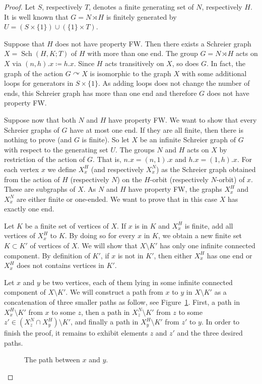 \documentclass[a4paper]{article}
\theoremstyle{definition}
\theoremstyle{remark}%
\DeclareMathOperator\Sch{Sch}
\begin{document}
%
\begin{proof}
Let $S$, respectively $T$, denotes a finite generating set of $N$, respectively $H$.
It is well known that $G=N\rtimes H$ is finitely generated by $U=(S\times\{1\}) \cup(\{1\}\times T)$.

Suppose that $H$ does not have property FW. Then there exists a Schreier graph $X=\Sch(H,K;T)$ of $H$ with more than one end. The group $G=N\rtimes H$ acts on $X$ via $(n,h).x \coloneqq h.x$.
Since $H$ acts transitively on $X$, so does $G$.
In fact, the graph of the action $G \curvearrowright X$ is isomorphic to the graph $X$ with some additional loops for generators in $S\times\{1\}$. As adding loops does not change the number of ends, this Schreier graph has more than one end and therefore $G$ does not have property FW.

Suppose now that both $N$ and $H$ have property FW. We want to show that every Schreier graphs of $G$ have at most one end. If they are all finite, then there is nothing to prove (and $G$ is finite). So let $X$ be an infinite Schreier graph of $G$ with respect to the generating set $U$. The groups $N$ and $H$ acts on $X$ by restriction of the action of $G$. That is, $n.x = (n,1).x$ and $h.x = (1,h).x$.
For each vertex $x$ we define $X_x^H$ (and respectively $X_x^N$) as the Schreier graph obtained from the action of $H$ (respectively $N$) on the $H$-orbit (respectively $N$-orbit) of $x$. These are subgraphs of $X$. As $N$ and $H$ have property FW, the graphs $X_x^H$ and $X_x^N$ are either finite or one-ended. We want to prove that in this case $X$ has exactly one end. 

Let $K$ be a finite set of vertices of $X$.
If $x$ is in $K$ and $X_x^H$ is finite, add all vertices of $X_x^H$ to $K$.
By doing so for every $x$ in $K$, we obtain a new finite set $K\subset K'$ of vertices of $X$.
We will show that $X\setminus K'$ has only one infinite connected component.
By definition of $K'$, if $x$ is not in $K'$, then either $X_x^H$ has one end or $X_x^H$ does not contains vertices in $K'$. 

Let $x$ and $y$ be two vertices, each of them lying in some infinite connected component of $X\setminus K'$.
We will construct a path from $x$ to $y$ in $X\setminus K'$ as a concatenation of three smaller paths as follow, see Figure~\ref{Figure:PathSemiDirect}.
First, a path in $X_x^H\setminus K'$ from $x$ to some $z$, then a path in $X_z^N\setminus K'$ from $z$ to some $z'\in (X_z^N\cap X_y^H)\setminus K'$, and finally a path in $X_y^H\setminus K'$ from $z'$ to $y$.
In order to finish the proof, it remains to exhibit elements $z$ and $z'$ and the three desired paths.
\begin{figure}[htbp]\centering
\scalebox{0.7}{
}
\caption{The path between $x$ and $y$.}
\label{Figure:PathSemiDirect}
\end{figure}


\end{proof}
\end{document}
